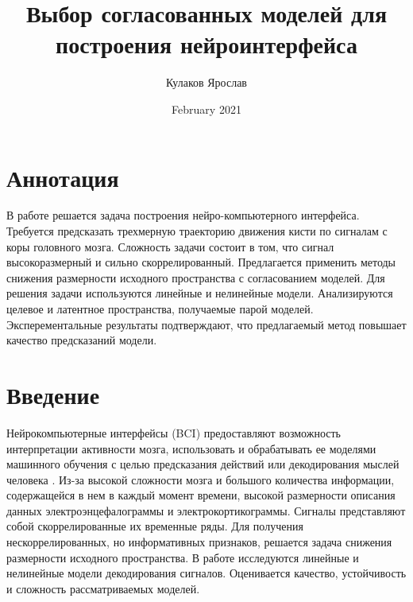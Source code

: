 \documentclass{article}
\title{Выбор согласованных моделей для построения нейроинтерфейса}
\author{Кулаков Ярослав}
\date{February 2021}
\begin{document}
\maketitle




\section{Аннотация}
В работе решается задача построения нейро-компьютерного интерфейса. Требуется предсказать трехмерную траекторию движения кисти по сигналам с коры головного мозга. Сложность задачи состоит в том, что сигнал высокоразмерный и сильно скоррелированный. Предлагается применить методы снижения размерности исходного пространства с согласованием моделей. Для решения задачи используются линейные и нелинейные модели. Анализируются целевое и латентное пространства, получаемые парой моделей. Эксперементальные результаты подтверждают, что предлагаемый метод повышает качество предсказаний модели.

\section{Введение}
Нейрокомпьютерные интерфейсы (BCI) предоставляют возможность интерпретации активности мозга, использовать и обрабатывать ее моделями машинного обучения с целью предсказания действий или декодирования мыслей человека \cite{general_purpose_1300799} \cite{BLANKERTZ20101303}. Из-за высокой сложности мозга и большого количества информации, содержащейся в нем в каждый момент времени, высокой размерности описания данных электроэнцефалограммы и электрокортикограммы. Сигналы представляют собой скоррелированные их временные ряды. Для получения нескоррелированных, но информативных признаков, решается задача снижения размерности исходного пространства.\cite{feature_selection_ecog} \cite{ATYABI2013319} \cite{7330455}
В работе исследуются линейные и нелинейные модели декодирования сигналов. Оценивается качество, устойчивость и сложность рассматриваемых моделей.  \par
\end{document}
